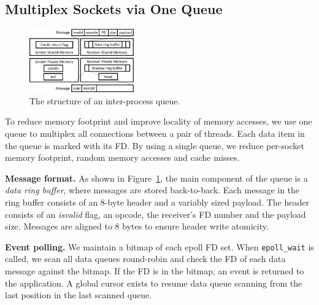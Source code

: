 
\iffalse
\subsection{Multiplex Sockets via One Queue}
\label{socksdirect:subsec:multiplex-conn}

\begin{figure}[t]
	\centering
	\includegraphics[width=0.4\textwidth]{images/locklessq_new}
	
	\caption{The structure of an inter-process queue.}
	
	\label{socksdirect:fig:locklessq-structure}
\end{figure}


To reduce memory footprint and improve locality of memory accesses, we use one queue to multiplex all connections between a pair of threads. Each data item in the queue is marked with its FD. By using a single queue, we reduce per-socket memory footprint, random memory accesses and cache misses.

\textbf{Message format.}
As shown in Figure~\ref{socksdirect:fig:locklessq-structure}, the main component of the queue is a \emph{data ring buffer}, where messages are stored back-to-back.
Each message in the ring buffer consists of an 8-byte header and a variably sized payload. The header consists of an \textit{isvalid} flag, an opcode, the receiver's FD number and the payload size. Messages are aligned to 8 bytes to ensure header write atomicity.%

\textbf{Event polling.}
We maintain a bitmap of each epoll FD set.
When \texttt{epoll\_wait} is called, we scan all data queues round-robin and check the FD of each data message against the bitmap. If the FD is in the bitmap, an event is returned to the application.
A global cursor exists to resume data queue scanning from the last position in the last scanned queue.

